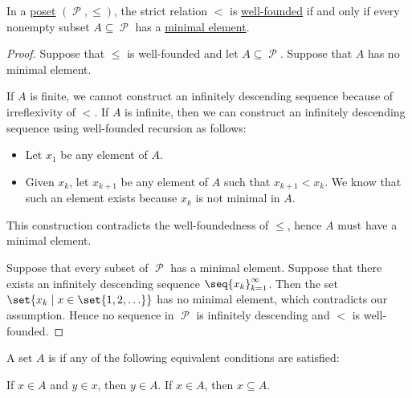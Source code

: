 \begin{proposition}\label{thm:infinite_descent_partial_order}
  In a \hyperref[def:poset]{poset} \( (\mscrP, \leq) \), the strict relation \( < \) is \hyperref[def:well_founded_relation]{well-founded} if and only if every nonempty subset \( A \subseteq \mscrP \) has a \hyperref[def:poset_extremal_points/maximal_and_minimal_element]{minimal element}.
\end{proposition}
\begin{proof}
  \SufficiencySubProof Suppose that \( \leq \) is well-founded and let \( A \subseteq \mscrP \). Suppose that \( A \) has no minimal element.

  If \( A \) is finite, we cannot construct an infinitely descending sequence because of irreflexivity of \( < \). If \( A \) is infinite, then we can construct an infinitely descending sequence using well-founded recursion as follows:
  \begin{itemize}
    \item Let \( x_1 \) be any element of \( A \).
    \item Given \( x_k \), let \( x_{k+1} \) be any element of \( A \) such that \( x_{k+1} < x_k \). We know that such an element exists because \( x_k \) is not minimal in \( A \).
  \end{itemize}

  This construction contradicts the well-foundedness of  \( \leq \), hence \( A \) must have a minimal element.

  \NecessitySubProof Suppose that every subset of \( \mscrP \) has a minimal element. Suppose that there exists an infinitely descending sequence \( \seq{ x_k }_{k=1}^\infty \). Then the set \( \set{ x_k \given x \in \set{ 1, 2, \ldots } } \) has no minimal element, which contradicts our assumption. Hence no sequence in \( \mscrP \) is infinitely descending and \( < \) is well-founded.
\end{proof}

\begin{definition}\label{def:transitive_set}
  A set \( A \) is  if any of the following equivalent conditions are satisfied:
  \begin{thmenum}
     If \( x \in A \) and \( y \in x \), then \( y \in A \).
     If \( x \in A \), then \( x \subseteq A \).
  \end{thmenum}
\end{definition}

